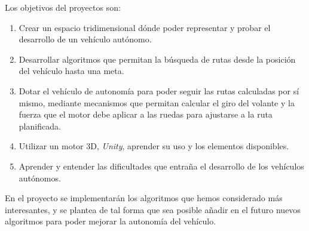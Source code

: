 Los objetivos del proyectos son:

\begin{enumerate}
\item Crear un espacio tridimensional dónde poder representar y probar el desarrollo de un vehículo autónomo.
\item Desarrollar algoritmos que permitan la búsqueda de rutas desde la posición del vehículo hasta una meta.
\item Dotar el vehículo de autonomía para poder seguir las rutas calculadas por sí mismo, mediante mecanismos que permitan calcular el giro del volante y la fuerza que el motor debe aplicar a las ruedas para ajustarse a la ruta planificada.
\item Utilizar un motor 3D, \textit{Unity}, aprender su uso y los elementos disponibles.
\item Aprender y entender las dificultades que entraña el desarrollo de los vehículos autónomos.
\end{enumerate}

En el proyecto se implementarán los algoritmos que hemos considerado más interesantes, y se plantea de tal forma que sea posible añadir en el futuro nuevos algoritmos para poder mejorar la autonomía del vehículo.
